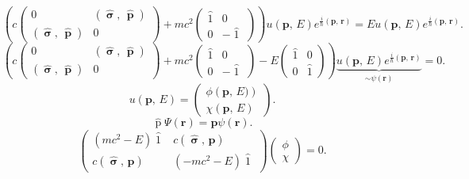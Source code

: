 \documentclass[a4paper]{article}
\begin{document}
\[
	\left( c \begin{pmatrix} 0 & \left(\widehat{\operatorname{
	\boldsymbol{\sigma}}},\,\widehat{\operatorname{\mathbf{p}}}  \right) \\
	\left( \widehat{\operatorname{\boldsymbol{\sigma}}},\,
\widehat{\operatorname{\mathbf{p}}}\right) &0\end{pmatrix} +mc^2 \begin{pmatrix} \widehat{\operatorname{1}} &0 \\
0& -\widehat{\operatorname{1}}\end{pmatrix}  \right)
u\left( \mathbf{p},\,E \right) e^{\frac{i}{\hbar }\left( \mathbf{p},\,\mathbf{r} \right) }=E u \left( \mathbf{p},\,E \right) 
e^{\frac{i}{\hbar }\left( \mathbf{p},\,\mathbf{r} \right) }
.\] 
\[
	\left( c \begin{pmatrix} 0 & \left(\widehat{\operatorname{
	\boldsymbol{\sigma}}},\,\widehat{\operatorname{\mathbf{p}}}  \right) \\
	\left( \widehat{\operatorname{\boldsymbol{\sigma}}},\,
\widehat{\operatorname{\mathbf{p}}}\right) &0\end{pmatrix} +mc^2 \begin{pmatrix} \widehat{\operatorname{1}} &0 \\
0& -\widehat{\operatorname{1}}\end{pmatrix}  -E\begin{pmatrix} \widehat{\operatorname{1}} &0 \\
0& \widehat{\operatorname{1}}\end{pmatrix}\right)
\underbrace{u\left( \mathbf{p},\,E \right) e^{\frac{i}{\hbar }\left( \mathbf{p},\,\mathbf{r} \right) }}_{\sim \psi(\mathbf{r})}=0
.\] 
\[
	u\left( \mathbf{p},\,E \right) = \begin{pmatrix} 
	\phi\left( \mathbf{p},\,E) \right) \\
\chi\left( \mathbf{p},\,E \right) \end{pmatrix} 
.\] 
\[
	\widehat{\operatorname{p}}\Psi(\mathbf{r})= \mathbf{p} \psi
	(\mathbf{r})
.\] 
\[
	\begin{pmatrix} (mc^2-E)\widehat{\operatorname{1}}&
	c \left( \widehat{\operatorname{\boldsymbol{\sigma}}},\,
\mathbf{p}\right) \\
c\left( \widehat{\operatorname{\boldsymbol{\sigma}}},\,
\mathbf{p}\right) & (-mc^2-E) \widehat{\operatorname{1}}\end{pmatrix} \begin{pmatrix} \phi\\ \chi \end{pmatrix} =0
.\] 
\end{document}
